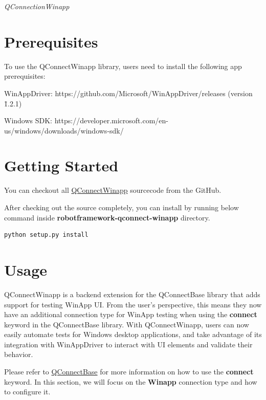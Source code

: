 %
%

\emph{QConnectionWinapp}

\hypertarget{prerequisites}{%
\section{Prerequisites}\label{prerequisites}}
To use the QConnectWinapp library, users need to install the following app prerequisites:

WinAppDriver: https://github.com/Microsoft/WinAppDriver/releases (version \>\=1.2.1)

Windows SDK: https://developer.microsoft.com/en-us/windows/downloads/windows-sdk/

\hypertarget{getting-started}{%
\section{Getting Started}\label{getting-started}}

You can checkout all
\href{https://github.com/test-fullautomation/robotframework-qconnect-winapp/}{QConnectWinapp}
sourcecode from the GitHub.

After checking out the source completely, you can install by running
below command inside \textbf{robotframework-qconnect-winapp} directory.

\begin{verbatim}
python setup.py install
\end{verbatim}

\hypertarget{usage}{%
\section{Usage}\label{usage}}

QConnectWinapp is a backend extension for the QConnectBase library that adds support for testing WinApp UI. 
From the user's perspective, this means they now have an additional connection type for WinApp testing when using the \textbf{connect} keyword in the QConnectBase library. 
With QConnectWinapp, users can now easily automate tests for Windows desktop applications, and take advantage of its integration with WinAppDriver to interact with UI elements and validate their behavior.

Please refer to \href{https://github.com/test-fullautomation/robotframework-qconnect-base/blob/develop/QConnectBase/QConnectBase.pdf}{QConnectBase} for more information on how to use the \textbf{connect} keyword. 
In this section, we will focus on the \textbf{Winapp} connection type and how to configure it.

